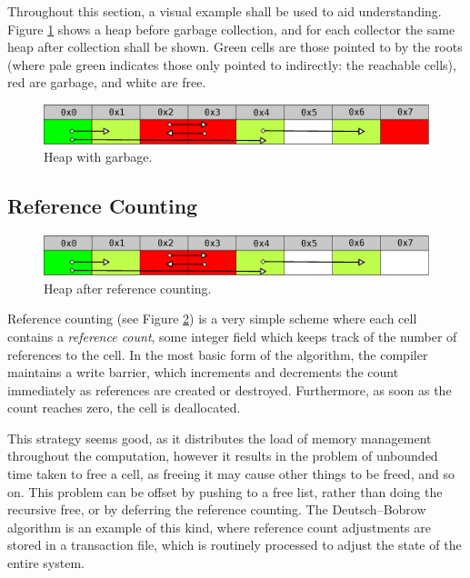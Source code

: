 Throughout this section, a visual example shall be used to aid
understanding. Figure \ref{fig:lit-gc-before} shows a heap before
garbage collection, and for each collector the same heap after
collection shall be shown. Green cells are those pointed to by the
roots (where pale green indicates those only pointed to indirectly:
the reachable cells), red are garbage, and white are free.

\begin{figure}[t]
  \centering
  \includegraphics[width=\textwidth]{lit-gc-before}
  \captionsetup{format=default}
  \caption{Heap with garbage.}
  \label{fig:lit-gc-before}
\end{figure}

\subsection{Reference Counting}
\label{sec:lit-gc-refcount}

\begin{figure}[t]
  \centering
  \includegraphics[width=\textwidth]{lit-gc-refcount}
  \caption{Heap after reference counting.}
  \label{fig:lit-gc-refcount}
\end{figure}

Reference counting (see Figure \ref{fig:lit-gc-refcount}) is a very
simple scheme where each cell contains a \textit{reference count},
some integer field which keeps track of the number of references to
the cell. In the most basic form of the algorithm, the compiler
maintains a write barrier, which increments and decrements the count
immediately as references are created or destroyed. Furthermore, as
soon as the count reaches zero, the cell is
deallocated\cite{Collins60}.

This strategy seems good, as it distributes the load of memory
management throughout the computation, however it results in the
problem of unbounded time taken to free a cell, as freeing it may
cause other things to be freed, and so on\cite{GarbageCollection}.
This problem can be offset by pushing to a free list, rather than
doing the recursive free, or by deferring the reference counting. The
Deutsch--Bobrow algorithm is an example of this kind, where reference
count adjustments are stored in a transaction file, which is routinely
processed to adjust the state of the entire system\cite{Deutsch76}.

